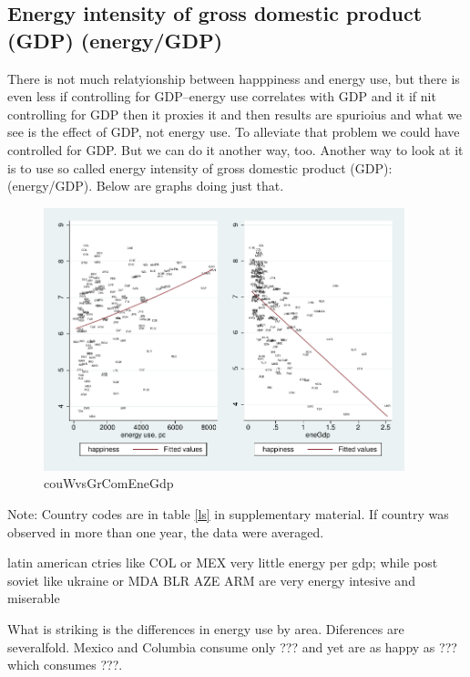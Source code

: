 \documentclass[10pt, letterpaper]{article}
\begin{document}
\begin{spacing}{1.4}
\subsection{Energy intensity of gross domestic product (GDP) (energy/GDP)}

There is not much relatyionship between happpiness and energy use, but there is
even less if controlling for GDP--energy use correlates with GDP and it if nit
controlling for GDP then it proxies it and then results are spurioius and what
we see is the effect of GDP, not energy use.  
To alleviate that problem we could have controlled for GDP. But we can do it
another way, too. 
Another way to look at it is to use so called energy intensity of gross domestic
product (GDP): (energy/GDP). Below  are graphs doing just that.


\begin{figure}[H]
 \includegraphics[height=3in]{graphsAndTables/couWvsGrComEneGdp.pdf}\centering
\caption{couWvsGrComEneGdp}\label{couWvsGrComEneGdp}
\end{figure}
{\scriptsize Note: Country codes are in table \ref{ls} in supplementary
  material. If country was observed in more than one year, the data were averaged.}

latin american ctries like COL or MEX very little energy per gdp; while post
soviet like ukraine or MDA BLR AZE ARM are very energy intesive and miserable

What is striking is the differences in energy use by area. Diferences are
severalfold. Mexico and Columbia
consume only ??? and yet are as happy as ??? which consumes ???.


\end{spacing}
\end{document}
